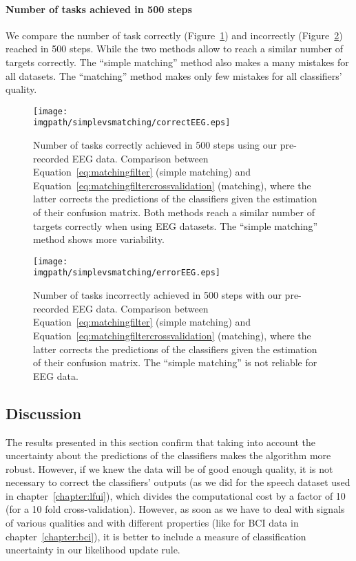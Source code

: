 \paragraph{Number of tasks achieved in 500 steps}

We compare the number of task correctly (Figure~\ref{fig:nCorrect_simplevsmatchingEEG}) and incorrectly (Figure~\ref{fig:nWrongEEG_simplevsmatchingEEG}) reached in 500 steps. While the two methods allow to reach a similar number of targets correctly. The ``simple matching'' method also makes a many mistakes for all datasets. The ``matching'' method makes only few mistakes for all classifiers' quality.

\visuopti{\newpage}

\begin{figure}[!htbp]
\centering
\texttt{[image: \\imgpath/simplevsmatching/correctEEG.eps]}
\caption{Number of tasks correctly achieved in 500 steps using our pre-recorded EEG data. Comparison between Equation~\ref{eq:matchingfilter} (simple matching) and Equation~\ref{eq:matchingfiltercrossvalidation} (matching), where the latter corrects the predictions of the classifiers given the estimation of their confusion matrix. Both methods reach a similar number of targets correctly when using EEG datasets. The ``simple matching''  method shows more variability.}
\label{fig:nCorrect_simplevsmatchingEEG}
\end{figure} 

\begin{figure}[!htbp]
\centering
\texttt{[image: \\imgpath/simplevsmatching/errorEEG.eps]}
\caption{Number of tasks incorrectly achieved in 500 steps with our pre-recorded EEG data. Comparison between Equation~\ref{eq:matchingfilter} (simple matching) and Equation~\ref{eq:matchingfiltercrossvalidation} (matching), where the latter corrects the predictions of the classifiers given the estimation of their confusion matrix. The ``simple matching'' is not reliable for EEG data.}
\label{fig:nWrongEEG_simplevsmatchingEEG}
\end{figure} 

\subsection{Discussion}

The results presented in this section confirm that taking into account the uncertainty about the predictions of the classifiers makes the algorithm more robust. However, if we knew the data will be of good enough quality, it is not necessary to correct the classifiers' outputs (as we did for the speech dataset used in chapter~\ref{chapter:lfui}), which divides the computational cost by a factor of 10 (for a 10 fold cross-validation). However, as soon as we have to deal with signals of various qualities and with different properties (like for BCI data in chapter~\ref{chapter:bci}), it is better to include a measure of classification uncertainty in our likelihood update rule.
